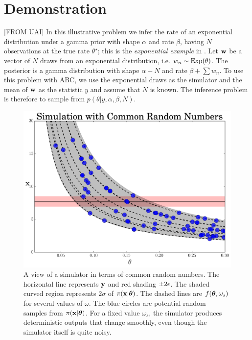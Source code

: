 \documentclass[]{article}
\begin{document}
\section{Demonstration}\label{sec:demo}
[FROM UAI] In this illustrative problem we infer the rate of an exponential distribution under a gamma prior with shape $\alpha$ and rate $\beta$, having $N$ observations at the true rate $\theta^{\star}$; this is the {\em exponential example} in \cite{turner2012tutorial}.  Let ${\bf w}$ be a vector of $N$ draws from an exponential distribution, i.e. $w_n \sim \operatorname{Exp}(\theta)$.  The posterior is a gamma distribution with shape $\alpha+N$ and rate $\beta + \sum w_n$.  To use this problem with ABC, we use the exponential draws as the simulator and the mean of ${\bf w}$ as the statistic $y$ and assume that $N$ is known.  The inference problem is therefore to sample from $p( \theta | y, \alpha, \beta, N )$.

\begin{figure}[t]
\vskip 0.2in
\begin{center}
\includegraphics[width=0.95\columnwidth]{./images/exp_crn_figure.pdf}
\caption{\small{A view of a simulator in terms of common random numbers.  The horizontal line represents ${\bf y}$ and red shading $\pm 2\epsilon$.  The shaded curved region represents $2\sigma$ of $\pi({\bf x}|{\bm \theta})$.  The dashed lines are $f({\bm \theta}, \omega_s)$ for several values of $\omega$.  The blue circles are potential random samples from $\pi({\bf x}|{\bm \theta})$.  For a fixed value $\omega_s$, the simulator produces deterministic outputs that change smoothly, even though the simulator itself is quite noisy.}}
\label{fig:exp-crns}
\end{center}
\vskip -0.2in
\end{figure} 
\end{document}
